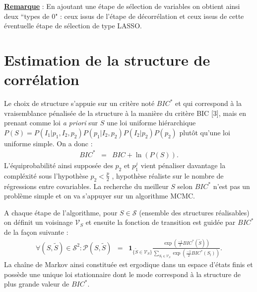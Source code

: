 \documentclass[12pt]{article}
\begin{document}
		\textbf{\underline{Remarque}} : En ajoutant une étape de sélection de variables on obtient ainsi deux  ``types de $0$"  : ceux issus de l'étape de décorrélation et ceux issus de cette éventuelle étape de sélection de type LASSO.
		
\section{Estimation de la structure de corrélation}
	 	
	
		Le choix de structure s'appuie sur un critère noté $BIC^*$ et qui correspond à la vraisemblance pénalisée de la structure à la manière du critère BIC [3], mais en prenant comme loi {\it a priori} sur $S$ une loi uniforme hiérarchique $P(S)=P(I_1 | p_1,I_2,p_2)P(p_1|I_2,p_2)P(I_2|p_2)P(p_2)$ plutôt qu'une loi uniforme simple. On a donc :
		\begin{eqnarray}
		BIC^*&=&BIC +\ln(P(S)) \label{Bicstar} .
	\end{eqnarray}	
	L'équiprobabilité ainsi supposée des $p_2$ et $p_1^j$ vient pénaliser davantage la compléxité sous l'hypothèse $p_2<\frac{p}{2}$ , hypothèse réaliste sur le nombre de régressions entre covariables. La recherche du meilleur $S$ selon $BIC^*$ n'est pas un problème simple et on va s'appuyer sur un algorithme MCMC.

	A chaque étape de l'algorithme, pour $S \in \mathcal{S}$ (ensemble des structures réalisables) on définit un voisinage $\mathcal{V}_{S}$ %
		et ensuite la fonction de transition est guidée par $BIC^*$ de la façon suivante :	
	\begin{eqnarray}
			\forall (S,\tilde{S}) \in \mathcal{S}^2 : \mathcal{P}(S,\tilde{S})&=& \mathbf{1}_{ \{\tilde{S}\in \mathcal{V}_{S}\} }\frac{\exp(\frac{-1}{2} BIC^*(\tilde{S}))}{\sum_{S_l\in \mathcal{V}_{S}}\exp(\frac{-1}{2} BIC^*(S_l))} .
	\end{eqnarray}
La chaîne de Markov ainsi constituée est ergodique dans un espace d'états finis et possède une unique loi stationnaire dont le mode correspond à la structure de plus grande valeur de $BIC^*$.
 
\end{document}
